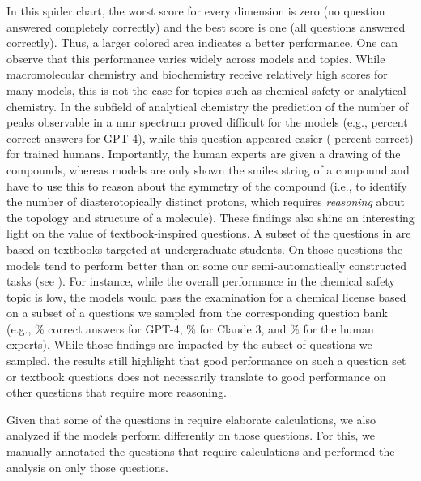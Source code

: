 \documentclass[11pt, oneside]{article}
\begin{document}
\begin{refsection}
\begin{figure}[!h]
\end{figure}
In this spider chart, the worst score for every dimension is zero (no question answered completely correctly) and the best score is one (all questions answered correctly). 
Thus, a larger colored area indicates a better performance. 
One can observe that this performance varies widely across models and topics. 
While macromolecular chemistry and biochemistry receive relatively high scores for many models, this is not the case for topics such as chemical safety or analytical chemistry.
In the subfield of analytical chemistry the prediction of the number of peaks observable in a \gls{nmr} spectrum proved difficult for the models (e.g.,  percent correct answers for GPT-4), while this question appeared easier ( percent correct) for trained humans.
Importantly, the human experts are given a drawing of the compounds, whereas models are only shown the \gls{smiles} string of a compound and have to use this to reason about the symmetry of the compound (i.e., to identify the number of diasterotopically distinct protons, which requires \emph{reasoning} about the topology and structure of a molecule). 
These findings also shine an interesting light on the value of textbook-inspired questions. 
A subset of the questions in \chembench are based on textbooks targeted at undergraduate students. 
On those questions the models tend to perform better than on some our semi-automatically constructed tasks (see ).
For instance, while the overall performance in the chemical safety topic is low, the models would pass the examination for a chemical license based on a subset of a questions we sampled from the corresponding question bank (e.g., \% correct answers for GPT-4, \% for Claude 3, and \% for the human experts).
While those findings are impacted by the subset of questions we sampled, the results still highlight that good performance on such a question set or textbook questions does not necessarily translate to good performance on other questions that require more reasoning.

Given that some of the questions in \chembench require elaborate calculations, we also analyzed if the models perform differently on those questions.
For this, we manually annotated the questions that require calculations and performed the analysis on only those questions.  %


\end{refsection}
\end{document}

